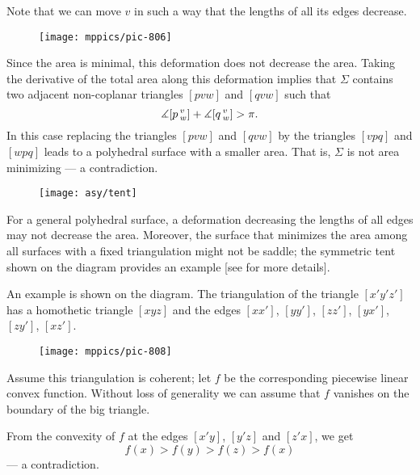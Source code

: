 Note that we can move $v$ in such a way that the lengths of all its edges decrease.

\begin{wrapfigure}{r}{43 mm}
\vskip0mm
\centering
\texttt{[image: mppics/pic-806]}
\end{wrapfigure}

Since the area is minimal,  this deformation does not decrease the area. 
Taking the derivative of the total area along this deformation implies that $\Sigma$
contains two adjacent non-coplanar triangles $[pvw]$ and $[qvw]$ such that
\[\measuredangle [p\,{}^{v}_{w}]+\measuredangle [q\,{}^{v}_{w}]> \pi.\]
In this case replacing the triangles $[pvw]$ and $[qvw]$
by the triangles $[vpq]$ and $[wpq]$
leads to a polyhedral surface with a smaller area.
That is, $\Sigma$ is not area minimizing --- a contradiction.
\qeds

{

\begin{wrapfigure}{r}{43 mm}
\vskip-8mm
\centering
\texttt{[image: asy/tent]}
\end{wrapfigure}

For a general polyhedral surface, a deformation decreasing the lengths of all edges may not decrease the area.
Moreover, the surface that minimizes the area among all surfaces with a fixed  triangulation might not be saddle;
the symmetric tent shown on the diagram provides an example [see  for more details].


An example is shown on the diagram.
The triangulation of the triangle $[x'y'z']$ has a homothetic triangle $[xyz]$ and the edges
$[xx']$, $[yy']$, $[zz']$, 
$[yx']$, $[zy']$, $[xz']$.

}

\medskip

\begin{wrapfigure}{r}{33 mm}
\vskip0mm
\centering
\texttt{[image: mppics/pic-808]}
\end{wrapfigure}

Assume this triangulation is coherent;
let $f$ be the corresponding piecewise linear convex function.
Without loss of generality we can assume that $f$ vanishes on the boundary of the big triangle.

From the convexity of $f$ at the edges $[x'y]$,  $[y'z]$ and $[z'x]$, we get 
\[f(x)>f(y)>f(z)>f(x)\]
--- a contradiction.
\qeds

